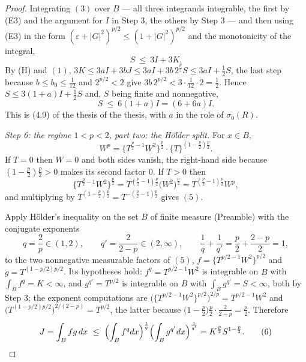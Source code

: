 \begin{proof}
Integrating $(3)$ over $B$ --- all three integrands integrable, the first by
(E3) and the argument for $I$ in Step 3, the others by Step 3 --- and then using
(E3) in the form $(\varepsilon+|G|^2)^{p/2}\le(1+|G|^2)^{p/2}$ and the
monotonicity of the integral,
\[
S\ \le\ 3I+3K .
\]
By (H) and $(1)$, $3K\le3aI+3bJ\le3aI+3b\,2^{\frac p2}S\le3aI+\frac12S$, the
last step because $b\le b_0\le\frac1{12}$ and $2^{p/2}<2$ give
$3b\,2^{p/2}<3\cdot\frac1{12}\cdot2=\frac12$.  Hence
$S\le3(1+a)I+\frac12S$ and, $S$ being finite and nonnegative,
\[
S\ \le\ 6(1+a)I=(6+6a)I .
\tag{4}
\]
This is (4.9) of the thesis of the thesis, with $a$ in the role of $\sigma_0(R)$.

\emph{Step 6: the regime $1<p<2$, part two: the H\"older split.}  For $x\in B$,
\[
W^p=\bigl\{T^{\frac p2-1}W^2\bigr\}^{\frac p2}
\cdot\bigl\{T\bigr\}^{\left(1-\frac p2\right)\frac p2} .
\tag{5}
\]
If $T=0$ then $W=0$ and both sides vanish, the right-hand side because
$(1-\frac p2)\frac p2>0$ makes its second factor $0$.  If $T>0$ then
\[
\bigl\{T^{\frac p2-1}W^2\bigr\}^{\frac p2}
=T^{\left(\frac p2-1\right)\frac p2}\bigl(W^2\bigr)^{\frac p2}
=T^{\left(\frac p2-1\right)\frac p2}W^p ,
\]
and multiplying by
$T^{\left(1-\frac p2\right)\frac p2}=T^{-\left(\frac p2-1\right)\frac p2}$
gives $(5)$.

Apply H\"older's inequality on the set $B$ of finite measure (Preamble) with the
conjugate exponents
\[
q=\frac2p\in(1,2),\qquad q'=\frac2{2-p}\in(2,\infty),
\qquad \frac1q+\frac1{q'}=\frac p2+\frac{2-p}2=1 ,
\]
to the two nonnegative measurable factors of $(5)$,
$f=\{T^{p/2-1}W^2\}^{p/2}$ and $g=T^{(1-p/2)p/2}$.  Its hypotheses hold:
$f^{q}=T^{p/2-1}W^2$ is integrable on $B$ with $\int_Bf^q=K<\infty$, and
$g^{q'}=T^{p/2}$ is integrable on $B$ with $\int_Bg^{q'}=S<\infty$, both by
Step 3; the exponent computations are
$\bigl(\{T^{p/2-1}W^2\}^{p/2}\bigr)^{2/p}=T^{p/2-1}W^2$ and
$\bigl(T^{(1-p/2)p/2}\bigr)^{2/(2-p)}=T^{p/2}$, the latter because
$\bigl(1-\frac p2\bigr)\frac p2\cdot\frac2{2-p}=\frac p2$.  Therefore
\[
J=\int_Bfg\,dx\ \le\ \Bigl(\int_Bf^{q}dx\Bigr)^{\frac1q}
\Bigl(\int_Bg^{q'}dx\Bigr)^{\frac1{q'}}
=K^{\frac p2}S^{1-\frac p2} .
\tag{6}
\]


\end{proof}

